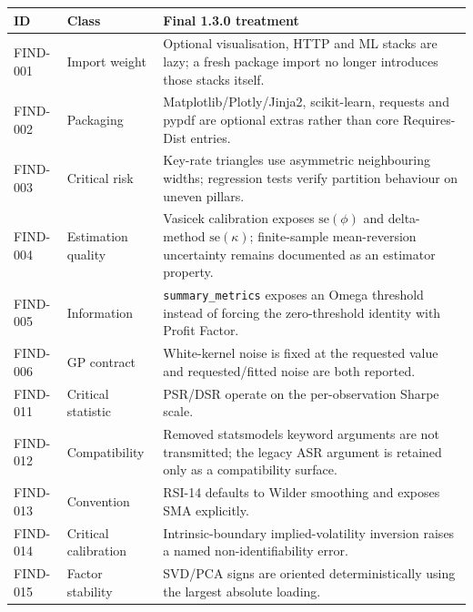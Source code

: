 \documentclass{asrpaper}
\begin{document}
\begin{center}\fontsize{8.1}{9.5}\selectfont
\begin{tabularx}{\linewidth}{@{}p{.15\linewidth}p{.18\linewidth}X@{}}
\toprule
\textbf{ID} & \textbf{Class} & \textbf{Final 1.3.0 treatment}\\
\midrule
FIND-001 & Import weight & Optional visualisation, HTTP and ML stacks are lazy; a fresh package import no longer introduces those stacks itself.\\
FIND-002 & Packaging & Matplotlib/Plotly/Jinja2, scikit-learn, requests and pypdf are optional extras rather than core Requires-Dist entries.\\
FIND-003 & Critical risk & Key-rate triangles use asymmetric neighbouring widths; regression tests verify partition behaviour on uneven pillars.\\
FIND-004 & Estimation quality & Vasicek calibration exposes $\mathrm{se}(\phi)$ and delta-method $\mathrm{se}(\kappa)$; finite-sample mean-reversion uncertainty remains documented as an estimator property.\\
FIND-005 & Information & \texttt{summary\_metrics} exposes an Omega threshold instead of forcing the zero-threshold identity with Profit Factor.\\
FIND-006 & GP contract & White-kernel noise is fixed at the requested value and requested/fitted noise are both reported.\\
FIND-011 & Critical statistic & PSR/DSR operate on the per-observation Sharpe scale.\\
FIND-012 & Compatibility & Removed statsmodels keyword arguments are not transmitted; the legacy ASR argument is retained only as a compatibility surface.\\
FIND-013 & Convention & RSI-14 defaults to Wilder smoothing and exposes SMA explicitly.\\
FIND-014 & Critical calibration & Intrinsic-boundary implied-volatility inversion raises a named non-identifiability error.\\
FIND-015 & Factor stability & SVD/PCA signs are oriented deterministically using the largest absolute loading.\\
\bottomrule
\end{tabularx}\end{center}
\end{document}
